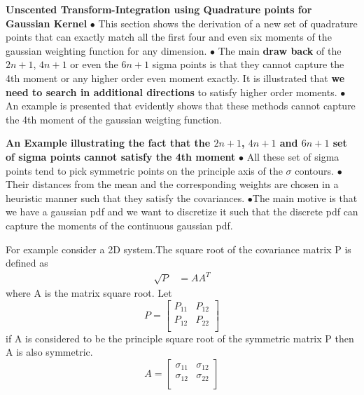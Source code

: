 \documentclass[landscape]{slides}
\begin{document}
\begin{slide}
 {\bf Unscented Transform-Integration using Quadrature points for Gaussian Kernel}\newline\newline
	$\bullet$ This section shows the derivation of a new set of quadrature points that can exactly match all the first four and even six moments of the gaussian weighting function for any dimension. \newline\newline
	$\bullet$ The main {\bf draw back} of the $2n+1$, $4n+1$ or even the $6n+1$ sigma points is that they cannot capture the 4th moment or any higher order even moment exactly. It is illustrated that {\bf we need to search in additional directions} to satisfy higher order moments.\newline\newline
	$\bullet$ An example is presented that evidently shows that these methods cannot capture the 4th moment of the gaussian weigting function.
	\end{slide}
\begin{slide}
{\bf An Example illustrating the fact that the $2n+1$, $4n+1$ and $6n+1$ set of sigma points cannot satisfy the 4th moment}\newline\newline
$\bullet$ All these set of sigma points tend to pick symmetric points on the principle axis of the $\sigma$ contours.\newline\newline
$\bullet$ Their distances from the mean and the corresponding weights are chosen in a heuristic manner such that they satisfy the covariances.\newline\newline 
$\bullet$The main motive is that we have a gaussian pdf and we want to discretize it such that the discrete pdf can capture the moments of the continuous gaussian pdf. 
		\end{slide}
\begin{slide}
	For example consider a 2D system.The square root of the covariance matrix P is defined as 
\begin{align*}
\sqrt{P}&=AA^T
\end{align*}
where A is the matrix square root. Let	
\[P=\left[ {\begin{array}{cc}
 P_{11} & P_{12}  \\
 P_{12} & P_{22}  \\
 \end{array} } \right]\]
if A is considered to be the principle square root of the symmetric matrix P then A is also symmetric. \newline
\[A=\left[ {\begin{array}{cc}
 \sigma_{11} & \sigma_{12}  \\
 \sigma_{12} & \sigma_{22}  \\
 \end{array} } \right]\]
 	\end{slide}
\end{document}
